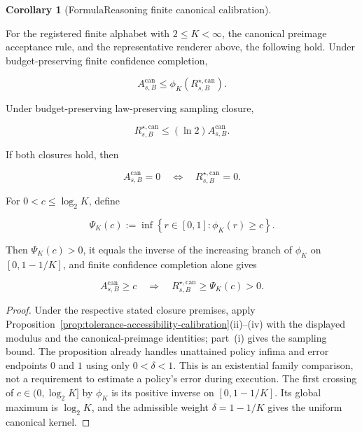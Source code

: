 \documentclass[10pt]{article} %
\providecommand{\1}{\mathbf{1}}  %
\theoremstyle{remark}
\theoremstyle{definition}
\newtheorem{corollary}{Corollary}
\begin{document}
\begin{corollary}[FormulaReasoning finite canonical calibration]
\label{cor:formula-reasoning-canonical-calibration}

For the registered finite alphabet with $2\leq K<\infty$, the canonical
preimage acceptance rule, and the representative renderer above, the
following hold. Under budget-preserving finite confidence completion,

\begin{equation}
A_{s,B}^{\mathrm{can}}
\leq
\phi_K\!\left(
R_{s,B}^{\star,\mathrm{can}}
\right).
\label{eq:canonical-completion-bound}
\end{equation}

Under budget-preserving law-preserving sampling closure,

\begin{equation}
R_{s,B}^{\star,\mathrm{can}}
\leq
(\ln2)A_{s,B}^{\mathrm{can}}.
\label{eq:canonical-sampling-bound}
\end{equation}

If both closures hold, then

\begin{equation}
A_{s,B}^{\mathrm{can}}=0
\quad\Longleftrightarrow\quad
R_{s,B}^{\star,\mathrm{can}}=0.
\label{eq:canonical-zero-equivalence}
\end{equation}

For $0<c\leq\log_2K$, define

\begin{equation}
\Psi_K(c)
:=
\inf\!\left\{
r\in[0,1]:
\phi_K(r)\geq c
\right\}.
\label{eq:canonical-inverse-calibration}
\end{equation}

Then $\Psi_K(c)>0$, it equals the inverse of the increasing branch of
$\phi_K$ on $[0,1-1/K]$, and finite confidence completion alone gives

\begin{equation}
A_{s,B}^{\mathrm{can}}\geq c
\quad\Longrightarrow\quad
R_{s,B}^{\star,\mathrm{can}}
\geq
\Psi_K(c)
>0.
\label{eq:canonical-accessibility-floor}
\end{equation}

\end{corollary}

\begin{proof}
Under the respective stated closure premises, apply
Proposition~\ref{prop:tolerance-accessibility-calibration}(ii)--(iv) with
the displayed modulus and the canonical-preimage identities; part~(i)
gives the sampling bound. The proposition already handles
unattained policy infima and error endpoints $0$ and $1$ using only
$0<\delta<1$. This is an existential family comparison, not a requirement
to estimate a policy's error during execution.
The first crossing of $c\in(0,\log_2K]$ by $\phi_K$ is its positive
inverse on $[0,1-1/K]$. Its global maximum is $\log_2K$, and the admissible
weight $\delta=1-1/K$ gives the uniform canonical kernel.
\end{proof}
\end{document}
